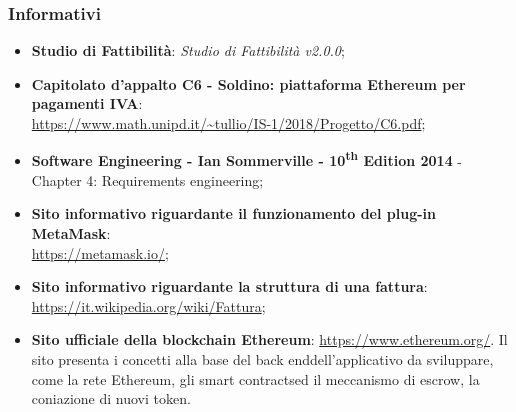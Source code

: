 \subsubsection{Informativi}
\begin{itemize}
	\item \textbf{Studio di Fattibilità}: \textit{Studio di Fattibilità v2.0.0};
	\item \textbf{Capitolato d'appalto C6 - Soldino: piattaforma Ethereum per pagamenti IVA}: \\ \url{ https://www.math.unipd.it/~tullio/IS-1/2018/Progetto/C6.pdf};
	\item \textbf{Software Engineering - Ian Sommerville - 10\textsuperscript{th} Edition 2014}
	\subitem - Chapter 4: Requirements engineering;
	\item \textbf{Sito informativo riguardante il funzionamento del plug-in MetaMask}:\\ \textsf{\url{ https://metamask.io/}};
	\item \textbf{Sito informativo riguardante la struttura di una fattura}:\\ \textsf{\url{ https://it.wikipedia.org/wiki/Fattura}};
	\item \textbf{Sito ufficiale della blockchain Ethereum}: \textsf{\url{https://www.ethereum.org/}}. Il sito presenta i concetti alla base del back end\glosp dell'applicativo da sviluppare, come la rete Ethereum\glo, gli smart contracts\glosp ed il meccanismo di escrow\glo, la coniazione di nuovi token\glo. 

\end{itemize}
